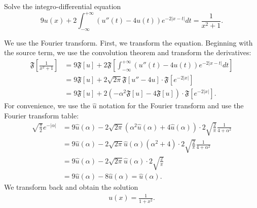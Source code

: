 \documentclass[11pt]{article}
\begin{document}
\begin{exercise}
    Solve the integro-differential equation 
    \[
        9u(x)+2\int_{-\infty}^{+\infty}\left(u''(t)-4u(t)\right)e^{-2|x-t|}dt=\frac{1}{x^2+1}.
    \]
\end{exercise}
\begin{solution}
    We use the Fourier transform. First, we transform the equation.
    Beginning with the source term, we use the convolution theorem and transform the derivatives:
    \begin{align}
        \mathfrak{F} \left[ \frac{1}{x^2+1} \right]
        &
        =
        9 \mathfrak{F}[ u ]
        +
        2
        \mathfrak{F}\left[ \int_{-\infty}^{+\infty}\left(u''(t)-4u(t)\right)e^{-2|x-t|}dt \right]
        \\&
        =
        9 \mathfrak{F}[ u ]
        +
        2
        \sqrt{2\pi}
        \mathfrak{F}\left[ u''-4u \right]
        \cdot 
        \mathfrak{F}\left[ e^{-2|x|} \right]
        \\&
        =
        9 \mathfrak{F}[ u ]
        +
        2
        \left( -\alpha^{2} \mathfrak{F}\left[ u \right] - 4 \mathfrak{F}\left[ u \right] \right)
        \cdot 
        \mathfrak{F}\left[ e^{-2|x|} \right]
        .
    \end{align}
    For convenience, we use the $\hat u$ notation for the Fourier transform and use the Fourier transform table:
    \begin{align}
        \sqrt{\frac{\pi}{2}} 
        e^{-|\alpha|}
        &
        =
        9 \hat u(\alpha)
        -
        2
        \sqrt{2\pi}
        \left( \alpha^{2} \hat{u}(\alpha) + 4 \hat{u}(\alpha) \right)
        \cdot 
        2
        \sqrt{\frac{2}{\pi}} 
        \frac{1}{4+\alpha^{2}}
        \\&
        =
        9 \hat u(\alpha)
        -
        2
        \sqrt{2\pi}
        \hat{u}(\alpha) \left( \alpha^{2} + 4 \right)
        \cdot 
        2
        \sqrt{\frac{2}{\pi}} 
        \frac{1}{4+\alpha^{2}}
        \\&
        =
        9 \hat u(\alpha)
        -
        2
        \sqrt{2\pi}
        \hat{u}(\alpha) 
        \cdot 
        2
        \sqrt{\frac{2}{\pi}} 
        \\&
        =
        9 \hat u(\alpha)
        -
        8
        \hat{u}(\alpha) 
        =
        \hat{u}(\alpha).
    \end{align}
    We transform back and obtain the solution 
    \begin{align}
        u(x) = \frac{1}{1+x^{2}}.
    \end{align}
\end{solution}
\end{document}
